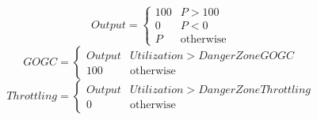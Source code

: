\documentclass[11pt]{article}
\begin{document}
    \begin{equation}
        Output =
        \begin{cases}
            100 & P > 100 \\
            0 & P < 0 \\
            P & \text{otherwise}
        \end{cases}
    \end{equation}
    \begin{equation}
        GOGC =
        \begin{cases}
            Output & Utilization > DangerZoneGOGC \\
            100 & \text{otherwise}
        \end{cases}
    \end{equation}
    \begin{equation}
        Throttling =
        \begin{cases}
            Output & Utilization > DangerZoneThrottling \\
            0 & \text{otherwise}
        \end{cases}
    \end{equation}
\end{document}
